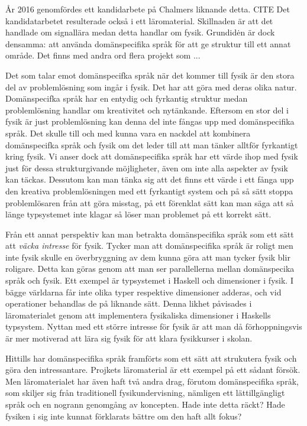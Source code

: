 \begin{binge}
År 2016 genomfördes ett kandidarbete på Chalmers liknande detta. CITE Det kandidatarbetet resulterade också i ett läromaterial. Skillnaden är att det handlade om signallära medan detta handlar om fysik. Grundidėn är dock densamma: att använda domänspecifika språk för att ge struktur till ett annat område. Det finns med andra ord flera projekt som ...



Det som talar emot domänspecifka språk när det kommer till fysik är den stora del av problemlösning som ingår i fysik. Det har att göra med deras olika natur. Domänspecifka språk har en entydig och fyrkantig struktur medan problemlösning handlar om kreativitet och nytänkande. Eftersom en stor del i fysik är just problemlösning kan denna del inte fångas upp med domänspecifika språk. Det skulle till och med kunna vara en nackdel att kombinera domänspecifka språk och fysik om det leder till att man tänker alltför fyrkantigt kring fysik. Vi anser dock att domänspecifika språk har ett värde ihop med fysik just för dessa strukturgivande möjligheter, även om inte alla aspekter av fysik kan täckas. Dessutom kan man tänka sig att det finns ett värde i ett fånga upp den kreativa problemlösningen med ett fyrkantigt system och på så sätt stoppa problemlösaren från att göra misstag, på ett förenklat sätt kan man säga att så länge typsystemet inte klagar så löser man problemet på ett korrekt sätt.

Från ett annat perspektiv kan man betrakta domänspecifika språk som ett sätt att \textit{väcka intresse} för fysik. Tycker man att domänspecifika språk är roligt men inte fysik skulle en överbryggning av dem kunna göra att man tycker fysik blir roligare. Detta kan göras genom att man ser parallellerna mellan domänspecika språk och fysik. Ett exempel är typsystemet i Haskell och dimensioner i fysik. I bägge världarna får inte olika typer respektive dimensioner adderas, och vid operationer behandlas de på liknande sätt. Denna likhet påvisades i läromaterialet genom att implementera fysikaliska dimensioner i Haskells typsystem. Nyttan med ett större intresse för fysik är att man då förhoppningsvis är mer motiverad att lära sig fysik för att klara fysikkurser i skolan.

Hittills har domänspecifika språk framförts som ett sätt att strukutera fysik och göra den intressantare. Projkets läromaterial är ett exempel på ett sådant försök. Men läromaterialet har även haft två andra drag, förutom domänspecifika språk, som skiljer sig från traditionell fysikundervisning, nämligen ett lättillgängligt språk och en nogrann genomgång av koncepten. Hade inte detta räckt? Hade fysiken i sig inte kunnat förklarats bättre om den haft allt fokus?


\end{binge}
